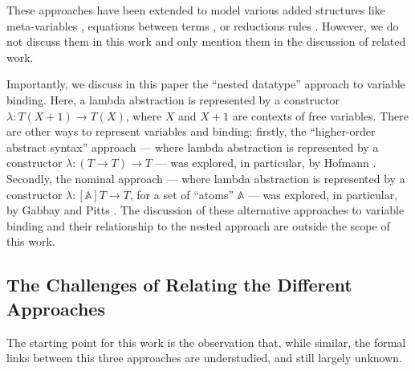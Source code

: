 These approaches have been extended to model various added structures like meta-variables
\cite{SecondOrderDep08}, equations between terms \cite{FioreHur10,2Signatures19},
or reductions rules \cite{UntypedRelativeMonads16,ReductionMonads20}.
%
However, we do not discuss them in this work and only mention them in the discussion of related work.


Importantly, we discuss in this paper the ``nested datatype'' approach to variable binding.
Here, a lambda abstraction is represented by a constructor $\lambda : T(X+1) \to T(X)$, where $X$ and $X+1$ are contexts of free variables.
There are other ways to represent variables and binding:
firstly, the ``higher-order abstract syntax'' approach --- where lambda abstraction is represented by a constructor $\lambda : (T \to T) \to T$ --- was explored, in particular, by Hofmann \cite{DBLP:conf/lics/Hofmann99}.
Secondly, the nominal approach --- where lambda abstraction is represented by a constructor $\lambda : [\mathbb{A}]T \to T$, for a set of ``atoms'' $\mathbb{A}$ --- was explored, in particular, by Gabbay and Pitts \cite{DBLP:conf/lics/GabbayP99}.
The discussion of these alternative approaches to variable binding and their relationship to the nested approach are outside the scope of this work.


\subsection{The Challenges of Relating the Different Approaches}

%
The starting point for this work is the observation that, while similar, the formal
links between this three approaches are understudied, and still largely unknown.


